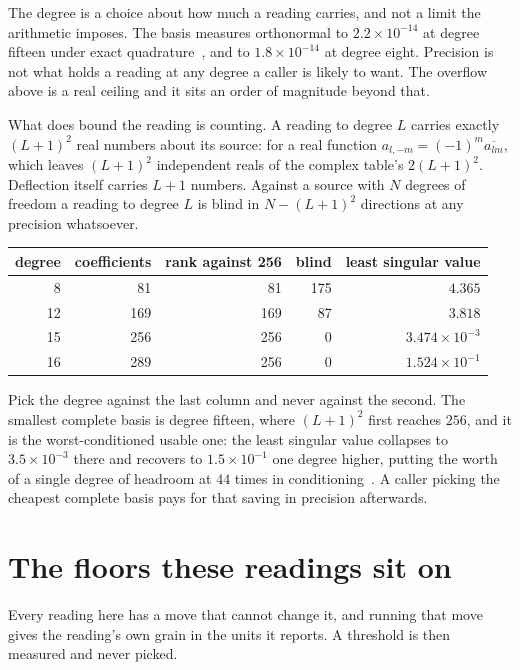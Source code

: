 The degree is a choice about how much a reading carries, and not a limit the arithmetic imposes. The basis measures orthonormal to \(2.2 \times 10^{-14}\) at degree fifteen under exact quadrature~\cite{src:Delsarte-Goethals-and-Seidel-1977}, and to \(1.8 \times 10^{-14}\) at degree eight. Precision is not what holds a reading at any degree a caller is likely to want. The overflow above is a real ceiling and it sits an order of magnitude beyond that.

What does bound the reading is counting. A reading to degree \(L\) carries exactly \((L+1)^2\) real numbers about its source: for a real function \(a_{l,-m} = (-1)^m \overline{a_{lm}}\), which leaves \((L+1)^2\) independent reals of the complex table's \(2(L+1)^2\). Deflection itself carries \(L+1\) numbers. Against a source with \(N\) degrees of freedom a reading to degree \(L\) is blind in \(N - (L+1)^2\) directions at any precision whatsoever.

\begin{center}
\begin{tabular}{@{}rrrrr@{}}
\toprule
degree & coefficients & rank against 256 & blind & least singular value \\
\midrule
8 & 81 & 81 & 175 & \(4.365\) \\
12 & 169 & 169 & 87 & \(3.818\) \\
15 & 256 & 256 & 0 & \(3.474 \times 10^{-3}\) \\
16 & 289 & 256 & 0 & \(1.524 \times 10^{-1}\) \\
\bottomrule
\end{tabular}
\end{center}

Pick the degree against the last column and never against the second. The smallest complete basis is degree fifteen, where \((L+1)^2\) first reaches \(256\), and it is the worst-conditioned usable one: the least singular value collapses to \(3.5 \times 10^{-3}\) there and recovers to \(1.5 \times 10^{-1}\) one degree higher, putting the worth of a single degree of headroom at \(44\) times in conditioning~\cite{src:Womersley-and-Sloan-2001}. A caller picking the cheapest complete basis pays for that saving in precision afterwards.

\section{The floors these readings sit on}

Every reading here has a move that cannot change it, and running that move gives the reading's own grain in the units it reports. A threshold is then measured and never picked.


